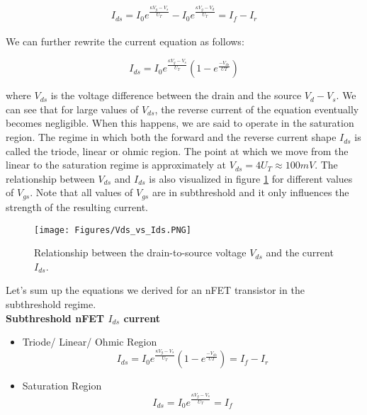 \begin{equation}
    I_{ds} = I_0 e^{\frac{\kappa V_g - V_s}{U_T}} - I_0 e^{\frac{\kappa V_g - V_d}{U_T}} = I_f - I_r
\end{equation}\\

We can further rewrite the current equation as follows:

\begin{equation}
    I_{ds} = I_0 e^{\frac{\kappa V_g - V_s}{U_T}} (1 - e^{\frac{-V_{ds}}{UT}}) \label{eq:satsubcurrent}
\end{equation}

where $V_{ds}$ is the voltage difference between the drain and the source $V_d - V_s$. We can see that for large values of $V_{ds}$, the reverse current of the equation eventually becomes negligible. When this happens, we are said to operate in the saturation region. The regime in which both the forward and the reverse current shape $I_{ds}$ is called the triode, linear or ohmic region. The point at which we move from the linear to the saturation regime is approximately at $V_{ds} = 4 U_T \approx 100 mV$. The relationship between $V_{ds}$ and $I_{ds}$ is also visualized in figure \ref{fig:vsd_vs_ids} for different values of $V_{gs}$. Note that all values of $V_{gs}$ are in subthreshold and it only influences the strength of the resulting current.\\

\begin{figure}
    \centering
    \texttt{[image: Figures/Vds\_vs\_Ids.PNG]}
    \caption{Relationship between the drain-to-source voltage $V_{ds}$ and the current $I_{ds}$.}
    \label{fig:vsd_vs_ids}
\end{figure}

Let's sum up the equations we derived for an nFET transistor in the subthreshold regime.\\

\textbf{Subthreshold nFET $I_{ds}$ current}
\begin{itemize}
    \item Triode/ Linear/ Ohmic Region
    \begin{equation}
        I_{ds} = I_0 e^{\frac{\kappa V_g - V_s}{U_T}} (1 - e^{\frac{-V_{ds}}{UT}}) = I_f - I_r
    \end{equation}
    \item Saturation Region
    \begin{equation}
        I_{ds} = I_0 e^{\frac{\kappa V_g - V_s}{U_T}} = I_f
    \end{equation}
\end{itemize}